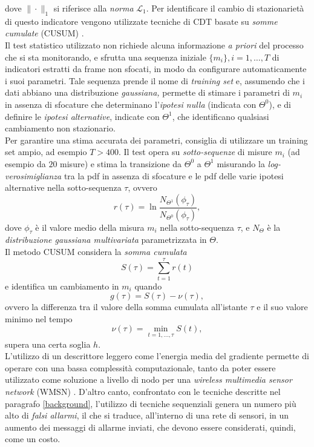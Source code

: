 dove $\| \cdot \|_1$ si riferisce alla \textit{norma} $\mathcal{L}_1$. 
Per identificare il cambio di stazionariet\`a di questo indicatore vengono utilizzate tecniche di CDT basate su \textit{somme cumulate} (CUSUM) \cite{alippi2008just}.\\
Il test statistico utilizzato non richiede alcuna informazione \textit{a priori} del processo che si sta monitorando, e sfrutta una sequenza iniziale $\{m_i\}, i=1,\dots,T$ di indicatori estratti da frame non sfocati, in modo da configurare automaticamente i suoi parametri. 
Tale sequenza prende il nome di \textit{training set} e, assumendo che i dati abbiano una distribuzione \textit{gaussiana,} permette di stimare i parametri di $m_i$ in assenza di sfocature che determinano l'\textit{ipotesi nulla} (indicata con $\Theta^0$), e di definire le \textit{ipotesi alternative}, indicate con $\Theta^1$, che identificano qualsiasi cambiamento non stazionario.\\
Per garantire una stima accurata dei parametri, \cite{alippi2010detecting} consiglia di utilizzare un training set ampio, ad esempio $T > 400$.
Il test opera su \textit{sotto-sequenze} di misure $m_i$ (ad esempio da $20$ misure) e stima la transizione da $\Theta^0$ a $\Theta^1$ misurando la \textit{log-verosimiglianza} tra la pdf in assenza di sfocature e le pdf delle varie ipotesi alternative nella sotto-sequenza $\tau$, ovvero
\[ r(\tau) = \ln \frac{N_{\Theta^1}(\phi_{\tau})}{N_{\Theta^0}(\phi_{\tau})}, \]
dove $\phi_{\tau}$ \`e il valore medio della misura $m_i$ nella sotto-sequenza $\tau$, e $N_{\Theta}$ \`e la \textit{distribuzione gaussiana multivariata} parametrizzata in $\Theta$.\\
Il metodo CUSUM considera la \textit{somma cumulata} 
\[ S(\tau) = \sum^\tau_{t=1} r(t) \]
e identifica un cambiamento in $m_i$ quando \[g(\tau)=S(\tau)-\nu(\tau),\] ovvero la differenza tra il valore della somma cumulata all'istante $\tau$ e il suo valore minimo nel tempo \[\nu(\tau)=\min_{t=1,...,\tau}S(t),\] supera una certa soglia $h$.\\
L'utilizzo di un descrittore leggero come l'energia media del gradiente permette di operare con una bassa complessit\`a computazionale, tanto da poter essere utilizzato come soluzione a livello di nodo per una \textit{wireless multimedia sensor network} (WMSN) \cite{akyildiz2007survey}.
D'altro canto, confrontato con le tecniche descritte nel paragrafo \ref{background}, l'utilizzo di tecniche sequenziali genera un numero pi\`u alto di \textit{falsi allarmi}, il che si traduce, all'interno di una rete di sensori, in un aumento dei messaggi di allarme inviati, che devono essere considerati, quindi, come un costo.